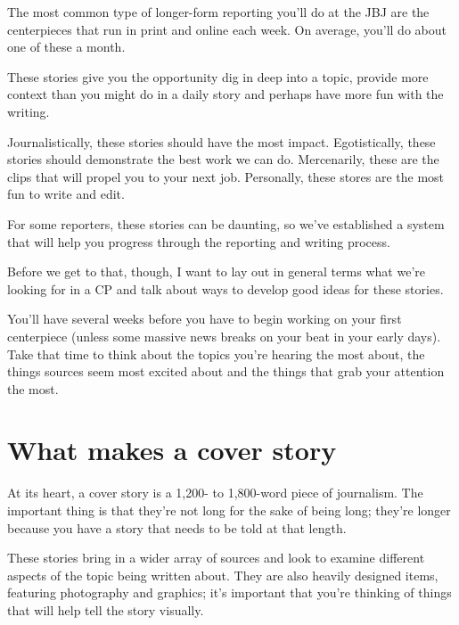 \documentclass[
  11pt,
  american,
  letterpaperpaper,
  extrafontsizes,onecolumn,openright
  ]{memoir}
\begin{document}
The most common type of longer-form reporting you'll do at the JBJ are the centerpieces that run in print and online each week. On average, you'll do about one of these a month.

These stories give you the opportunity dig in deep into a topic, provide more context than you might do in a daily story and perhaps have more fun with the writing.

Journalistically, these stories should have the most impact. Egotistically, these stories should demonstrate the best work we can do. Mercenarily, these are the clips that will propel you to your next job. Personally, these stores are the most fun to write and edit.

For some reporters, these stories can be daunting, so we've established a system that will help you progress through the reporting and writing process.

Before we get to that, though, I want to lay out in general terms what we're looking for in a CP and talk about ways to develop good ideas for these stories.

\leavevmode{}%
\begin{greybox}[frametitle=Onboarding Path]
You'll have several weeks before you have to begin working on your first centerpiece (unless some massive news breaks on your beat in your early days). Take that time to think about the topics you're hearing the most about, the things sources seem most excited about and the things that grab your attention the most.

\end{greybox}

\hypertarget{what-makes-a-cover-story}{%
\section*{What makes a cover story}\label{what-makes-a-cover-story}}

At its heart, a cover story is a 1,200- to 1,800-word piece of journalism. The important thing is that they're not long for the sake of being long; they're longer because you have a story that needs to be told at that length.

These stories bring in a wider array of sources and look to examine different aspects of the topic being written about. They are also heavily designed items, featuring photography and graphics; it's important that you're thinking of things that will help tell the story visually.
\end{document}
